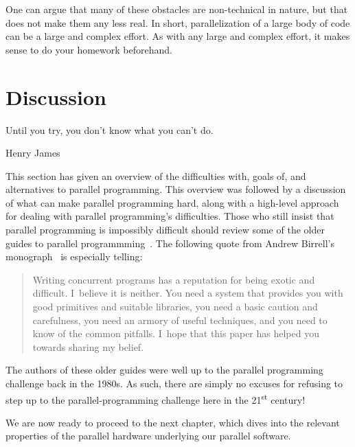 {	One can argue that many of these obstacles are non-technical
	in nature, but that does not make them any less real.
	In short, parallelization of a large body of code
	can be a large and complex effort.
	As with any large and complex effort, it makes sense to
	do your homework beforehand.
}\QuickQuizEnd

\section{Discussion}
\label{sec:intro:Discussion}
%
\epigraph{Until you try, you don't know what you can't do.}
	 {Henry James}

This section has given an overview of the difficulties with, goals of,
and alternatives to parallel programming.
This overview was followed by a discussion of
what can make parallel programming hard, along with a high-level
approach for dealing with parallel programming's difficulties.
Those who still insist that parallel programming is impossibly difficult
should review some of the older guides to parallel
programmming~\cite{SQNTParallel,AndrewDBirrell1989Threads,Beck85,Inman85}.
The following quote from Andrew Birrell's
monograph~\cite{AndrewDBirrell1989Threads} is especially telling:

\begin{quote}
	Writing concurrent programs has a reputation for being exotic
	and difficult.
	I~believe it is neither.
	You need a system that provides you with good primitives
	and suitable libraries,
	you need a basic caution and carefulness, you need an armory of
	useful techniques, and you need to know of the common pitfalls.
	I~hope that this paper has helped you towards sharing my belief.
\end{quote}

The authors of these older guides were well up to the parallel programming
challenge back in the 1980s.
As such, there are simply no excuses for refusing to step up to the
parallel-programming challenge here in the 21\textsuperscript{st} century!

We are now ready to proceed to the next chapter, which dives into the
relevant properties of the parallel hardware underlying our parallel
software.

